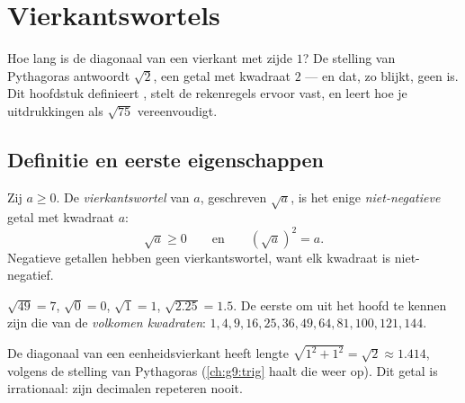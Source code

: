 \chapter{Vierkantswortels}\label{ch:g9:sqrt}

Hoe lang is de diagonaal van een vierkant met zijde $1$? De stelling van
Pythagoras antwoordt $\sqrt 2$, een getal met kwadraat $2$ --- en dat, zo blijkt,
geen  is. Dit hoofdstuk definieert , stelt de rekenregels
ervoor vast, en leert hoe je uitdrukkingen als $\sqrt{75}$ vereenvoudigt.

\section{Definitie en eerste eigenschappen}

\begin{definition}[Vierkantswortel]\label{def:g9:sqrt:def}
Zij $a \geq 0$. De \emph{vierkantswortel} van $a$,
geschreven $\sqrt a$, is het enige \emph{niet-negatieve} getal met kwadraat $a$:
\[
\sqrt a \geq 0
\qquad\text{en}\qquad
\left(\sqrt a\right)^2 = a .
\]
Negatieve getallen hebben geen vierkantswortel, want elk kwadraat is
niet-negatief.
\end{definition}

\begin{example}
$\sqrt{49} = 7$, $\sqrt 0 = 0$, $\sqrt 1 = 1$, $\sqrt{2.25} = 1.5$. De eerste
 om uit het hoofd te kennen zijn die van de \emph{volkomen
kwadraten}: $1, 4, 9, 16, 25, 36, 49, 64, 81, 100, 121, 144$.
\end{example}

\begin{omfigure}

{\small De diagonaal van een eenheidsvierkant heeft lengte
$\sqrt{1^2 + 1^2} = \sqrt2 \approx 1.414$, volgens de stelling van Pythagoras
(\cref{ch:g9:trig} haalt die weer op). Dit getal is irrationaal: zijn decimalen
repeteren nooit.}
\end{omfigure}

